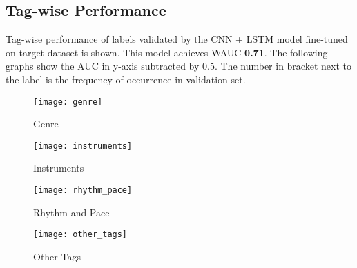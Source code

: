 \begin{appendices}
\section{Tag-wise Performance}
\label{tagperformance}
Tag-wise performance of labels validated by the CNN + LSTM model fine-tuned on target dataset is shown. This model achieves WAUC \textbf{0.71}. The following graphs show the AUC in y-axis subtracted by 0.5. The number in bracket next to the label is the frequency of occurrence in validation set.
 
\begin{figure}[h] 
\centering
\texttt{[image: genre]}
\caption{Genre}
 \label{fig:genre}
 \end{figure}
\FloatBarrier
\begin{figure}[h] 
\centering
\texttt{[image: instruments]}
\caption{Instruments}
 \label{fig:instruments}
 \end{figure}
\FloatBarrier
\begin{figure}[h] 
\centering
\texttt{[image: rhythm\_pace]}
\caption{Rhythm and Pace}
 \label{fig:rhythm}
 \end{figure}
\FloatBarrier
\begin{figure}[h] 
\centering
\texttt{[image: other\_tags]}
\caption{Other Tags}
 \label{fig:other}
 \end{figure}
\FloatBarrier

\end{appendices}
